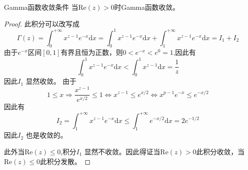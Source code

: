 \begin{theorem}{Gamma函数收敛条件}
	当$\mathrm{Re}\left(z\right)>0$时Gamma函数收敛。
\end{theorem}

\begin{proof}
	此积分可以改写成
	$$ 	\Gamma\left(z\right) = \int_{0}^{\text{+}\infty }{x^{z-1}e^{-x}\mathrm{d}x}= \int_{0}^{1}{x^{z-1}e^{-x}\mathrm{d}x}+ \int_{1}^{\text{+}\infty }{x^{z-1}e^{-x}\mathrm{d}x}= I_1+I_2$$
	由于$e^{-x}$区间$[0,1]$有界且恒为正数，则$0<e^{-x}<e^0 = 1$,因此有
	$$\int_{0}^{1}{x^{z-1}e^{-x}\mathrm{d}x} < \int_{0}^{1}{x^{z-1}\mathrm{d}x} = \frac{1}{z}$$
	因此$I_1$ 显然收敛。
	由于
	$$1\le x \Rightarrow \frac{x^{z-1}}{e^{x/2}}\le 1 \Leftrightarrow x^{z-1}\le e^{x/2} \Leftrightarrow x^{p-1}e^{-x}\le e^{-x/2}$$
	因此有
	$$I_2 = \int_{1}^{\text{+}\infty }{x^{z-1}e^{-x}\mathrm{d}x}\le \int_{1}^{\text{+}\infty }{e^{-x/2}\mathrm{d}x} = 2e^{-1/2}$$
	因此$I_2$ 也是收敛的。
	
	此外当$\mathrm{Re}\left(z\right)\le 0$,积分$I_1$ 显然不收敛。因此得证当$\mathrm{Re}\left(z\right)>0$此积分收敛，当$\mathrm{Re}\left(z\right)\le0$此积分发散。	
\end{proof}


